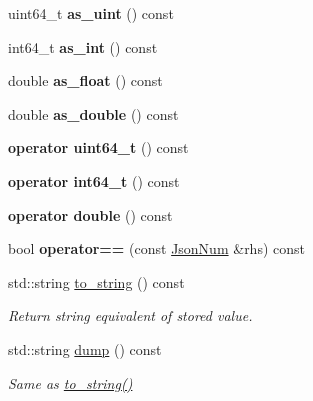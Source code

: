 \begin{DoxyCompactItemize}
uint64\+\_\+t {\bfseries as\+\_\+uint} () const
\item 
\mbox{\label{classnta_1_1utils_1_1JsonNum_a0467c186ef4b7e9e72f703e1cd165737}} 
int64\+\_\+t {\bfseries as\+\_\+int} () const
\item 
\mbox{\label{classnta_1_1utils_1_1JsonNum_a5ca1010f8bfd27569f5cb2ddabacded7}} 
double {\bfseries as\+\_\+float} () const
\item 
\mbox{\label{classnta_1_1utils_1_1JsonNum_a7853ed40074bf81aa5cc0d139df753aa}} 
double {\bfseries as\+\_\+double} () const
\item 
\mbox{\label{classnta_1_1utils_1_1JsonNum_a01eada48d909adc6edef2dbe75809b9e}} 
{\bfseries operator uint64\+\_\+t} () const
\item 
\mbox{\label{classnta_1_1utils_1_1JsonNum_a5d31c8dcc19bf7d03c83b547b922806f}} 
{\bfseries operator int64\+\_\+t} () const
\item 
\mbox{\label{classnta_1_1utils_1_1JsonNum_ac71592324ce19e5c2da0d2b130243bab}} 
{\bfseries operator double} () const
\item 
\mbox{\label{classnta_1_1utils_1_1JsonNum_afd53b30172e0414c7ca735d7d4118877}} 
bool {\bfseries operator==} (const \hyperlink{classnta_1_1utils_1_1JsonNum}{Json\+Num} \&rhs) const
\item 
\mbox{\label{classnta_1_1utils_1_1JsonNum_a7038acc17c49e0162d6462dc0591a82d}} 
std\+::string \hyperlink{classnta_1_1utils_1_1JsonNum_a7038acc17c49e0162d6462dc0591a82d}{to\+\_\+string} () const
\begin{DoxyCompactList}\small\item\em Return string equivalent of stored value. \end{DoxyCompactList}\item 
\mbox{\label{classnta_1_1utils_1_1JsonNum_a304a9adefcdf875554ef0bd04225594a}} 
std\+::string \hyperlink{classnta_1_1utils_1_1JsonNum_a304a9adefcdf875554ef0bd04225594a}{dump} () const
\begin{DoxyCompactList}\small\item\em Same as \hyperlink{classnta_1_1utils_1_1JsonNum_a7038acc17c49e0162d6462dc0591a82d}{to\+\_\+string()} \end{DoxyCompactList}\end{DoxyCompactItemize}
